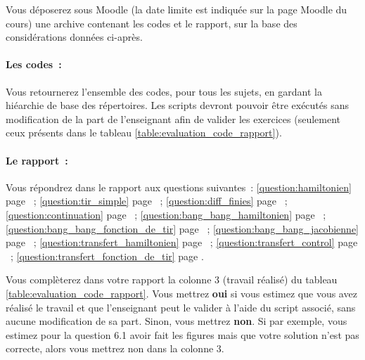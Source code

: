 
Vous d\'eposerez sous Moodle (la date limite est indiqu\'ee sur la page Moodle du cours) une archive contenant les codes et le rapport,
sur la base des consid\'erations donn\'ees ci-apr\`es.

\paragraph*{Les codes~:}

Vous retournerez l'ensemble des codes, pour tous les sujets, en gardant la hi\'earchie de base des r\'epertoires. Les scripts devront pouvoir \^etre ex\'ecut\'es
sans modification de la part de l'enseignant afin de valider les exercices (seulement ceux pr\'esents dans le tableau \ref{table:evaluation_code_rapport}).

\paragraph*{Le rapport~:}

Vous r\'epondrez dans le rapport aux questions suivantes~:
\ref{question:hamiltonien}                page \pageref{question:hamiltonien}~;
\ref{question:tir_simple}                 page \pageref{question:tir_simple}~;
\ref{question:diff_finies}                page \pageref{question:diff_finies}~;
\ref{question:continuation}               page \pageref{question:continuation}~;
\ref{question:bang_bang_hamiltonien}      page \pageref{question:bang_bang_hamiltonien}~;
\ref{question:bang_bang_fonction_de_tir}  page \pageref{question:bang_bang_fonction_de_tir}~;
\ref{question:bang_bang_jacobienne}       page \pageref{question:bang_bang_jacobienne}~;
\ref{question:transfert_hamiltonien}      page \pageref{question:transfert_hamiltonien}~;
\ref{question:transfert_control}          page \pageref{question:transfert_control}~;
\ref{question:transfert_fonction_de_tir}  page \pageref{question:transfert_fonction_de_tir}.

Vous compl\`eterez dans votre rapport la colonne 3 (travail r\'ealis\'e) du tableau \ref{table:evaluation_code_rapport}.
Vous mettrez \textbf{oui} si vous estimez que vous avez r\'ealis\'e le travail
et que l'enseignant peut le valider \`a l'aide du script associ\'e, sans aucune modification de sa part.
Sinon, vous mettrez \textbf{non}. Si par exemple, vous estimez pour la question 6.1 avoir fait les figures mais que votre solution n'est
pas correcte, alors vous mettrez non dans la colonne 3.

